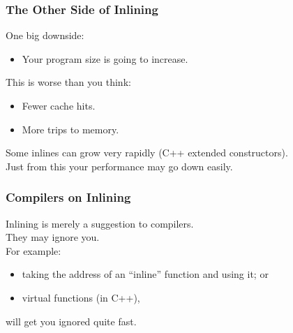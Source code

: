 \begin{frame}
  \frametitle{The Other Side of Inlining}

  

  One big downside:
  \begin{itemize}
    \item Your program size is going to increase.
  \end{itemize}
   This is worse than you think:
      \begin{itemize}
        \item Fewer cache hits.
        \item More trips to memory.
      \end{itemize}
   Some inlines can grow very rapidly (C++ extended constructors).\\[1em]
  Just from this your performance may go down easily.
  
\end{frame}

\begin{frame}
  \frametitle{Compilers on Inlining}

  

  Inlining is merely a suggestion to compilers.\\
  They may ignore you.\\[1em]

  For example:
  \begin{itemize}
    \item taking the address of an ``inline'' function and using it; or
    \item virtual functions (in C++),
  \end{itemize}
  will get you ignored quite fast.
  
\end{frame}

